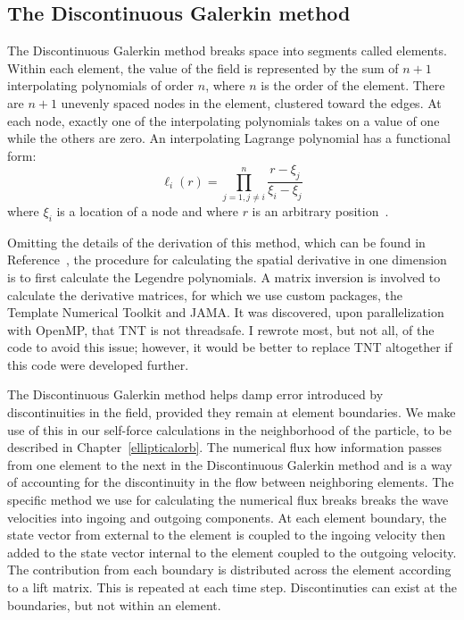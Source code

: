 \subsection{The Discontinuous Galerkin method}
The Discontinuous Galerkin method breaks space into segments called elements. Within each element, the value of the field is represented by the sum of $n+1$ interpolating polynomials of order $n$, where $n$ is the order of the element. There are $n+1$ unevenly spaced nodes in the element, clustered toward the edges. At each node, exactly one of the interpolating polynomials takes on a value of one while the others are zero. An interpolating Lagrange polynomial has a functional form:
\begin{equation}
  \ell_i(r)=\prod_{j=1,j\ne i}^{n}\frac{r-\xi_j}{\xi_i-\xi_j}
\end{equation}
where $\xi_i$ is a location of a node and where $r$ is an arbitrary position~\cite{dghesthaven}. 


Omitting the details of the derivation of this method, which can be found in Reference~\cite{dghesthaven}, the procedure for calculating the spatial derivative in one dimension is to first calculate the Legendre polynomials. A matrix inversion is involved to calculate the derivative matrices, for which we use custom packages, the Template Numerical Toolkit and JAMA. It was discovered, upon parallelization with OpenMP, that TNT is not threadsafe. I rewrote most, but not all, of the code to avoid this issue; however, it would be better to replace TNT altogether if this code were developed further.

The Discontinuous Galerkin method helps damp error introduced by discontinuities in the field, provided they remain at element boundaries. We make use of this in our self-force calculations in the neighborhood of the particle, to be described in Chapter~\ref{ellipticalorb}. The numerical flux how information passes from one element to the next in the Discontinuous Galerkin method and is a way of accounting for the discontinuity in the flow between neighboring elements. The specific method we use for calculating the numerical flux breaks breaks the wave velocities into ingoing and outgoing components. At each element boundary, the state vector from external to the element is coupled to the ingoing velocity then added to the state vector internal to the element coupled to the outgoing velocity. The contribution from each boundary is distributed across the element according to a lift matrix. This is repeated at each time step. Discontinuties can exist at the boundaries, but not within an element. 



